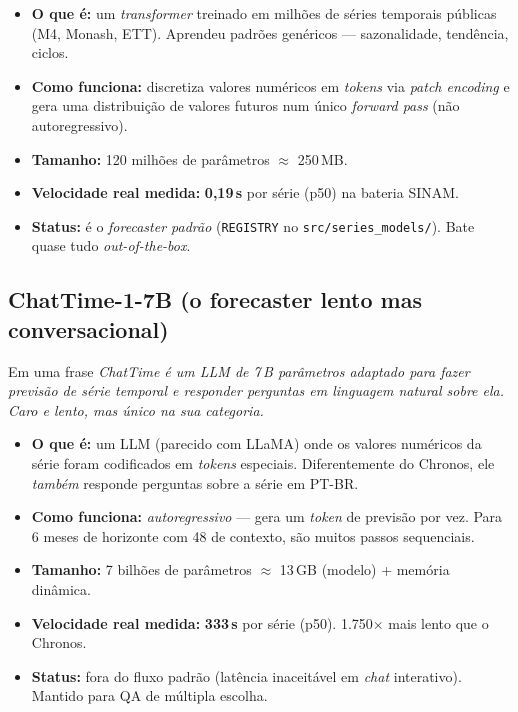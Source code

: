 \documentclass[11pt,a4paper]{article}
\newcommand{\code}[1]{\texttt{\small #1}}
\begin{document}
\begin{itemize}[leftmargin=*]
\item \textbf{O que é:} um \emph{transformer} treinado em milhões de
séries temporais públicas (M4, Monash, ETT). Aprendeu padrões
genéricos --- sazonalidade, tendência, ciclos.

\item \textbf{Como funciona:} discretiza valores numéricos em
\emph{tokens} via \emph{patch encoding} e gera uma distribuição de
valores futuros num único \emph{forward pass} (não autoregressivo).

\item \textbf{Tamanho:} 120 milhões de parâmetros $\approx$ 250\,MB.

\item \textbf{Velocidade real medida:} \textbf{0,19\,s} por série
(p50) na bateria SINAM.

\item \textbf{Status:} é o \emph{forecaster padrão} (\code{REGISTRY}
no \code{src/series_models/}). Bate quase tudo \emph{out-of-the-box}.
\end{itemize}

\subsection{ChatTime-1-7B (o forecaster lento mas conversacional)}

\begin{infobox}{Em uma frase}
\emph{ChatTime é um LLM de 7\,B parâmetros adaptado para fazer
previsão de série temporal \emph{e} responder perguntas em linguagem
natural sobre ela. Caro e lento, mas único na sua categoria.}
\end{infobox}

\begin{itemize}[leftmargin=*]
\item \textbf{O que é:} um LLM (parecido com LLaMA) onde os valores
numéricos da série foram codificados em \emph{tokens} especiais.
Diferentemente do Chronos, ele \emph{também} responde perguntas
sobre a série em PT-BR.

\item \textbf{Como funciona:} \emph{autoregressivo} --- gera um
\emph{token} de previsão por vez. Para 6 meses de horizonte com 48 de
contexto, são muitos passos sequenciais.

\item \textbf{Tamanho:} 7 bilhões de parâmetros $\approx$ 13\,GB
(modelo) + memória dinâmica.

\item \textbf{Velocidade real medida:} \textbf{333\,s} por série
(p50). 1.750$\times$ mais lento que o Chronos.

\item \textbf{Status:} fora do fluxo padrão (latência inaceitável em
\emph{chat} interativo). Mantido para QA de múltipla escolha.
\end{itemize}
\end{document}
